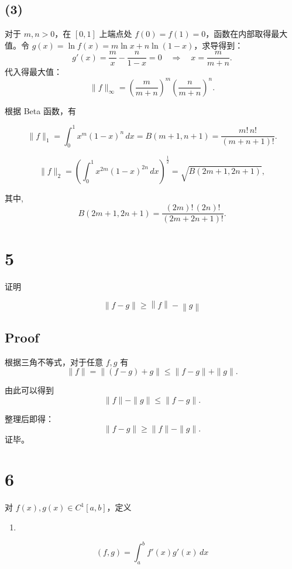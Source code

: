 \documentclass[11pt]{article}
\providecommand{\tightlist}{%
      \setlength{\itemsep}{0pt}\setlength{\parskip}{0pt}}
\begin{document}
\subsection{(3)}\label{section-2}

对于 \(m,n>0\)，在 \([0,1]\) 上端点处
\(f(0)=f(1)=0\)，函数在内部取得最大值。令
\(g(x)=\ln f(x)= m\ln x+n\ln(1-x)\)，求导得到： \[
g'(x)=\frac{m}{x}-\frac{n}{1-x}=0 \quad \Longrightarrow \quad x=\frac{m}{m+n}.
\] 代入得最大值： \[
\|f\|_{\infty} = \left(\frac{m}{m+n}\right)^m \left(\frac{n}{m+n}\right)^n.
\]

根据 Beta 函数，有

\[
\|f\|_{1} = \int_0^1 x^m(1-x)^n\,dx = B(m+1,n+1) = \frac{m! \, n!}{(m+n+1)!}.
\]

\[
\|f\|_{2} = \left(\int_0^1 x^{2m}(1-x)^{2n}\,dx\right)^{\frac{1}{2}} = \sqrt{B(2m+1,2n+1)},
\]

其中, \[
B(2m+1,2n+1) = \frac{(2m)! \, (2n)!}{(2m+2n+1)!}.
\]

    \section{5}\label{section}

证明

\[
\left\lVert f - g\right\rVert \geqslant \left\lVert f\right\rVert  - \left\lVert g\right\rVert 
\]

    \subsection{Proof}\label{proof}

根据三角不等式，对于任意 \(f, g\) 有 \[
   \|f\| = \|(f-g) + g\| \leqslant \|f-g\| + \|g\|.
   \]

由此可以得到 \[
   \|f\| - \|g\| \leqslant \|f-g\|.
   \]

整理后即得： \[
   \|f-g\| \geqslant \|f\| - \|g\|.
   \] 证毕。

    \section{6}\label{section}

对 \(f(x),g(x) \in C^1[a,b]\)，定义

\begin{enumerate}
\def\labelenumi{(\arabic{enumi})}
\tightlist
\item
\end{enumerate}

\[
(f,g) = \int_a^bf'(x)g'(x)\,dx
\]
\end{document}
